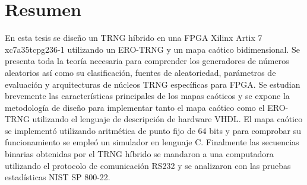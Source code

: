 \chapter{Resumen}
    
    En esta tesis se diseño un TRNG híbrido en una FPGA Xilinx Artix 7 xc7a35tcpg236-1 utilizando un ERO-TRNG y un mapa caótico bidimensional. Se presenta toda la teoría necesaria para comprender los generadores de números aleatorios así como su clasificación, fuentes de aleatoriedad, parámetros de evaluación y arquitecturas de núcleos TRNG específicas para FPGA. Se estudian brevemente las características principales de los mapas caóticos y se expone la metodología de diseño para implementar tanto el mapa caótico como el ERO-TRNG utilizando el lenguaje de descripción de hardware VHDL. El mapa caótico se implementó utilizando aritmética de punto fijo de 64 bits y para comprobar su funcionamiento se empleó un simulador en lenguaje C. Finalmente las secuencias binarias obtenidas por el TRNG híbrido se mandaron a una computadora utilizando el protocolo de comunicación RS232 y se analizaron con las pruebas estadísticas NIST SP 800-22. 
